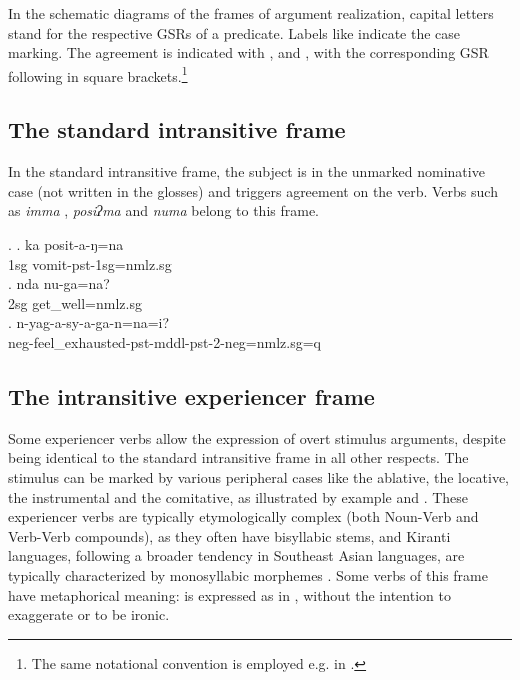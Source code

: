 In the schematic diagrams of the frames of argument realization,  capital letters stand for the respective GSRs of a predicate. Labels like  indicate the case marking. The agreement is indicated with ,  and , with the corresponding GSR following in square brackets.\footnote{The same notational convention is employed  e.g. in \citet{Schikowski2014_Flexible}.} 
 
\subsection{The standard intransitive frame}\label{stand-itr}


\noindent 
In the standard intransitive frame, the subject is in the unmarked nominative case (not written in the glosses) and triggers agreement on the verb. Verbs such as \emph{imma} ,  \emph{posiʔma}  and \emph{numa}  belong to this frame.

\ex. \ag. ka posit-a-ŋ=na\\
		 {\sc 1sg} vomit-{\sc pst-1sg=nmlz.sg}	\\
 	\bg. nda nu-ga=na?\\
	{\sc 2sg}  get\_well{=nmlz.sg}	\\
	\bg. n-yag-a-sy-a-ga-n=na=i?\\ 
{\sc neg}-feel\_exhausted{\sc -pst-mddl-pst-2-neg=nmlz.sg=q}\\

\subsection{The intransitive experiencer frame}\label{itr-exp}


\noindent 
Some experiencer verbs allow the expression of overt stimulus arguments, despite being identical to  the standard intransitive frame in all other respects. The stimulus can be marked by various peripheral cases like the ablative, the locative, the instrumental and the comitative, as illustrated by example \Next[a] and \Next[b].  These experiencer verbs are typically etymologically complex (both Noun-Verb and Verb-Verb compounds), as they often have bisyllabic stems, and Kiranti languages, following a broader tendency in Southeast Asian languages, are typically characterized by monosyllabic morphemes \citep{Matisoff1990_Bulging}. Some verbs of this frame have metaphorical meaning:  is expressed as in \Next[c], without the intention to exaggerate or to be ironic. 

